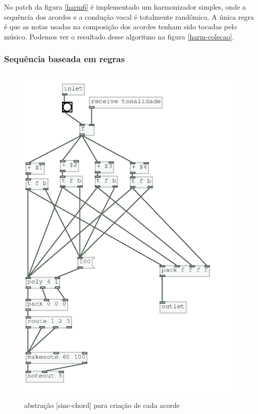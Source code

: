 \documentclass{ppgmus}
\begin{document}
No patch da figura \ref{harm6} é implementado um harmonizador simples, onde a sequência dos acordes e
a condução vocal é totalmente randômica. A única regra é que as notas usadas na composição
dos acordes tenham sido tocadas pelo músico. Podemos ver o resultado desse algoritmo na figura \ref{harm-colecao}.

\subsubsection{Sequência baseada em regras}


\begin{figure}
\includegraphics[scale=.6]{sinc-chord}
\caption{abstração [sinc-chord] para criação de cada acorde }
\label{sinc-chord}
\end{figure}
\end{document}
